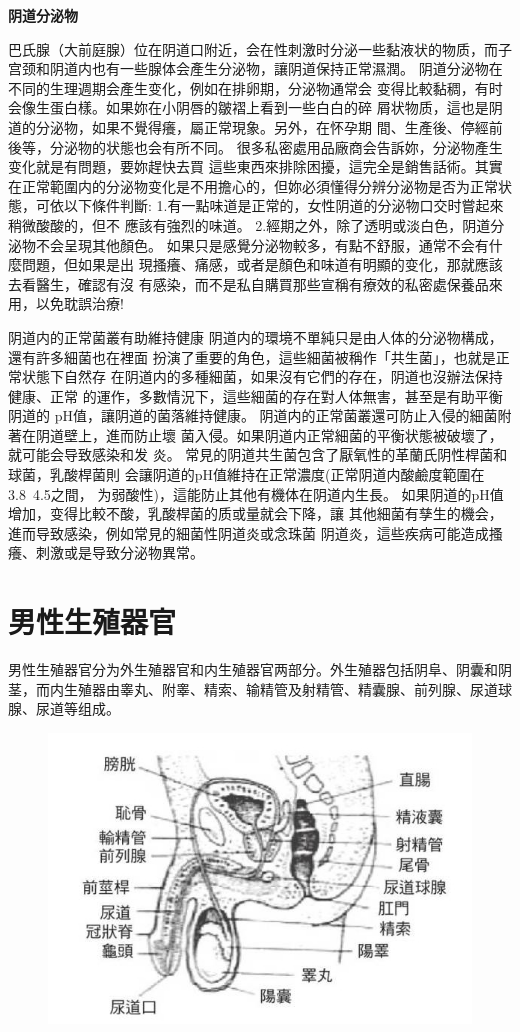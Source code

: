 \documentclass[12pt,UTF8]{ctexbook}
\begin{document}
\textbf{阴道分泌物}

巴氏腺（大前庭腺）位在阴道口附近，会在性刺激时分泌一些黏液状的物质，而子宫颈和阴道内也有一些腺体会產生分泌物，讓阴道保持正常濕潤。
阴道分泌物在不同的生理週期会產生变化，例如在排卵期，分泌物通常会
变得比較黏稠，有时会像生蛋白樣。如果妳在小阴唇的皺褶上看到一些白白的碎
屑状物质，這也是阴道的分泌物，如果不覺得癢，屬正常現象。另外，在怀孕期
間、生產後、停經前後等，分泌物的状態也会有所不同。
很多私密處用品廠商会告訴妳，分泌物產生变化就是有問題，要妳趕快去買
這些東西來排除困擾，這完全是銷售話術。其實在正常範圍内的分泌物变化是不用擔心的，但妳必須懂得分辨分泌物是否为正常状態，可依以下條件判斷:
1.有一點味道是正常的，女性阴道的分泌物口交时嘗起來稍微酸酸的，但不
應該有強烈的味道。
2.經期之外，除了透明或淡白色，阴道分泌物不会呈現其他顏色。
如果只是感覺分泌物較多，有點不舒服，通常不会有什麼問題，但如果是出
現搔癢、痛感，或者是顏色和味道有明顯的变化，那就應該去看醫生，確認有沒
有感染，而不是私自購買那些宣稱有療效的私密處保養品來用，以免耽誤治療!

阴道内的正常菌叢有助維持健康
阴道内的環境不單純只是由人体的分泌物構成，還有許多細菌也在裡面
扮演了重要的角色，這些細菌被稱作「共生菌」，也就是正常状態下自然存
在阴道内的多種細菌，如果沒有它們的存在，阴道也沒辦法保持健康、正常
的運作，多數情況下，這些細菌的存在對人体無害，甚至是有助平衡阴道的
pH值，讓阴道的菌落維持健康。
阴道内的正常菌叢還可防止入侵的細菌附著在阴道壁上，進而防止壞
菌入侵。如果阴道内正常細菌的平衡状態被破壞了，就可能会导致感染和发
炎。
常見的阴道共生菌包含了厭氧性的革蘭氏阴性桿菌和球菌，乳酸桿菌則
会讓阴道的pH值維持在正常濃度(正常阴道内酸鹼度範圍在3.8~4.5之間，
为弱酸性)，這能防止其他有機体在阴道内生長。
如果阴道的pH值增加，变得比較不酸，乳酸桿菌的质或量就会下降，讓
其他細菌有孳生的機会，進而导致感染，例如常見的細菌性阴道炎或念珠菌
阴道炎，這些疾病可能造成搔癢、刺激或是导致分泌物異常。

\chapter{男性生殖器官}

男性生殖器官分为外生殖器官和内生殖器官两部分。外生殖器包括阴阜、阴囊和阴茎，而内生殖器由睾丸、附睾、精索、输精管及射精管、精囊腺、前列腺、尿道球腺、尿道等组成。

\begin{figure}[htbp]
	\centering
	\includegraphics[width=0.7\linewidth]{4}
	\caption{}
\end{figure}
\end{document}
